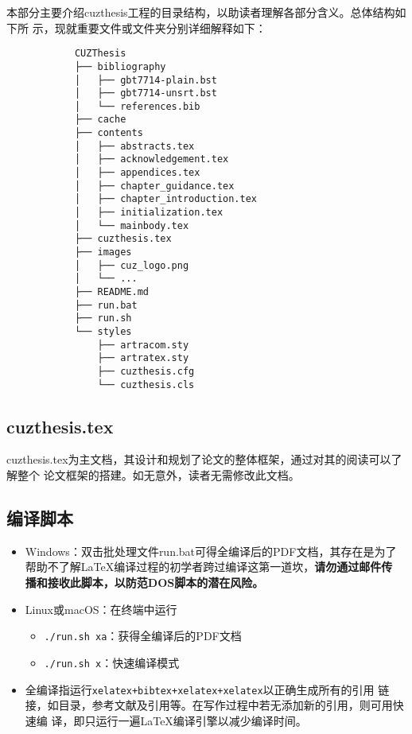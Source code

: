 本部分主要介绍cuzthesis工程的目录结构，以助读者理解各部分含义。总体结构如下所
示，现就重要文件或文件夹分别详细解释如下：

\begingroup
    \small\linespread{1}
    \begin{center}
        \begin{verbatim}
            CUZThesis
            ├── bibliography
            │   ├── gbt7714-plain.bst
            │   ├── gbt7714-unsrt.bst
            │   └── references.bib
            ├── cache
            ├── contents
            │   ├── abstracts.tex
            │   ├── acknowledgement.tex
            │   ├── appendices.tex
            │   ├── chapter_guidance.tex
            │   ├── chapter_introduction.tex
            │   ├── initialization.tex
            │   └── mainbody.tex
            ├── cuzthesis.tex
            ├── images
            │   ├── cuz_logo.png
            │   └── ...
            ├── README.md
            ├── run.bat
            ├── run.sh
            └── styles
                ├── artracom.sty
                ├── artratex.sty
                ├── cuzthesis.cfg
                └── cuzthesis.cls
        \end{verbatim}
    \end{center}
\endgroup

\subsection{cuzthesis.tex}\label{sub:cuzthesis}

cuzthesis.tex为主文档，其设计和规划了论文的整体框架，通过对其的阅读可以了解整个
论文框架的搭建。如无意外，读者无需修改此文档。

\subsection{编译脚本}\label{sub:scripts}

\begin{itemize}
    \item Windows：双击批处理文件run.bat可得全编译后的PDF文档，其存在是为了
    帮助不了解\LaTeX{}编译过程的初学者跨过编译这第一道坎，\textbf{请勿通过邮件传
    播和接收此脚本，以防范DOS脚本的潜在风险。}
    \item Linux或macOS：在终端中运行
        \begin{itemize}
            \item \verb|./run.sh xa|：获得全编译后的PDF文档
            \item \verb|./run.sh x|：快速编译模式
        \end{itemize}
    \item 全编译指运行\verb|xelatex+bibtex+xelatex+xelatex|以正确生成所有的引用
    链接，如目录，参考文献及引用等。在写作过程中若无添加新的引用，则可用快速编
    译，即只运行一遍\LaTeX{}编译引擎以减少编译时间。
\end{itemize}

